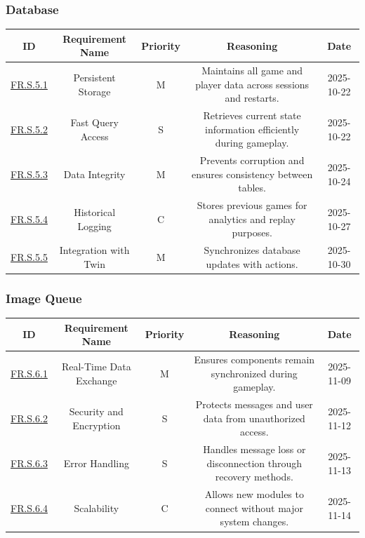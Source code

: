 \documentclass{article}
\begin{document}
\vspace{1em}

\subsubsection*{\GameState{} Database}

\begin{tabular}{|c|c|c|c|c|}
\hline
\textbf{ID} & \textbf{Requirement Name} & \textbf{Priority} &
\textbf{Reasoning} & \textbf{Date} \\
\hline
\hyperref[FR.S.5.1]{FR.S.5.1} & Persistent Storage & M &
\parbox[t]{4cm}{Maintains all game and player data across sessions
and restarts.} &
2025-10-22 \\
\hline
\hyperref[FR.S.5.2]{FR.S.5.2} & Fast Query Access & S &
\parbox[t]{4cm}{Retrieves current state information efficiently
during gameplay.} &
2025-10-22 \\
\hline
\hyperref[FR.S.5.3]{FR.S.5.3} & Data Integrity & M &
\parbox[t]{4cm}{Prevents corruption and ensures consistency between
tables.} &
2025-10-24 \\
\hline
\hyperref[FR.S.5.4]{FR.S.5.4} & Historical Logging & C &
\parbox[t]{4cm}{Stores previous games for analytics and replay
purposes.} &
2025-10-27 \\
\hline
\hyperref[FR.S.5.5]{FR.S.5.5} & Integration with Twin & M &
\parbox[t]{4cm}{Synchronizes database updates with \DigitalTwin{}
actions.} &
2025-10-30 \\
\hline
\end{tabular}

\vspace{1em}

\subsubsection*{Image Queue}

\begin{tabular}{|c|c|c|c|c|}
\hline
\textbf{ID} & \textbf{Requirement Name} & \textbf{Priority} &
\textbf{Reasoning} & \textbf{Date} \\
\hline
\hyperref[FR.S.6.1]{FR.S.6.1} & Real-Time Data Exchange & M &
\parbox[t]{4cm}{Ensures components remain synchronized during
gameplay.} &
2025-11-09 \\
\hline
\hyperref[FR.S.6.2]{FR.S.6.2} & Security and Encryption & S &
\parbox[t]{4cm}{Protects messages and user data from unauthorized
access.} &
2025-11-12 \\
\hline
\hyperref[FR.S.6.3]{FR.S.6.3} & Error Handling & S &
\parbox[t]{4cm}{Handles message loss or disconnection through
recovery methods.} &
2025-11-13 \\
\hline
\hyperref[FR.S.6.4]{FR.S.6.4} & Scalability & C &
\parbox[t]{4cm}{Allows new modules to connect without major system
changes.} &
2025-11-14 \\
\hline
\end{tabular}
\end{document}
